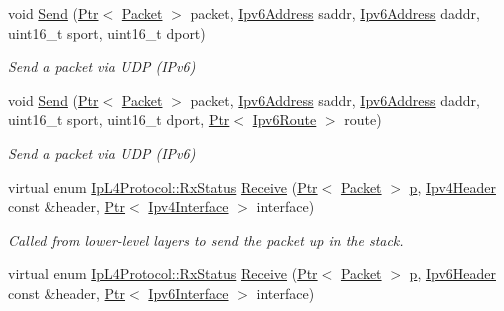 \begin{DoxyCompactItemize}
void \hyperlink{classns3_1_1UdpL4Protocol_a851f80be4bdcda596b2e739610423cc5}{Send} (\hyperlink{classns3_1_1Ptr}{Ptr}$<$ \hyperlink{classns3_1_1Packet}{Packet} $>$ packet, \hyperlink{classns3_1_1Ipv6Address}{Ipv6\+Address} saddr, \hyperlink{classns3_1_1Ipv6Address}{Ipv6\+Address} daddr, uint16\+\_\+t sport, uint16\+\_\+t dport)
\begin{DoxyCompactList}\small\item\em Send a packet via U\+DP (I\+Pv6) \end{DoxyCompactList}\item 
void \hyperlink{classns3_1_1UdpL4Protocol_a67c43cce42ee11ed12829957c758fccb}{Send} (\hyperlink{classns3_1_1Ptr}{Ptr}$<$ \hyperlink{classns3_1_1Packet}{Packet} $>$ packet, \hyperlink{classns3_1_1Ipv6Address}{Ipv6\+Address} saddr, \hyperlink{classns3_1_1Ipv6Address}{Ipv6\+Address} daddr, uint16\+\_\+t sport, uint16\+\_\+t dport, \hyperlink{classns3_1_1Ptr}{Ptr}$<$ \hyperlink{classns3_1_1Ipv6Route}{Ipv6\+Route} $>$ route)
\begin{DoxyCompactList}\small\item\em Send a packet via U\+DP (I\+Pv6) \end{DoxyCompactList}\item 
virtual enum \hyperlink{classns3_1_1IpL4Protocol_afd3744c89902fff232e2fd45f558c80e}{Ip\+L4\+Protocol\+::\+Rx\+Status} \hyperlink{classns3_1_1UdpL4Protocol_a61e0744cc561ec265c8a888552e27310}{Receive} (\hyperlink{classns3_1_1Ptr}{Ptr}$<$ \hyperlink{classns3_1_1Packet}{Packet} $>$ \hyperlink{lte__link__budget__x2__handover__measures_8m_ac9de518908a968428863f829398a4e62}{p}, \hyperlink{classns3_1_1Ipv4Header}{Ipv4\+Header} const \&header, \hyperlink{classns3_1_1Ptr}{Ptr}$<$ \hyperlink{classns3_1_1Ipv4Interface}{Ipv4\+Interface} $>$ interface)
\begin{DoxyCompactList}\small\item\em Called from lower-\/level layers to send the packet up in the stack. \end{DoxyCompactList}\item 
virtual enum \hyperlink{classns3_1_1IpL4Protocol_afd3744c89902fff232e2fd45f558c80e}{Ip\+L4\+Protocol\+::\+Rx\+Status} \hyperlink{classns3_1_1UdpL4Protocol_aeb5af158d9e854d1f528a19214a0e455}{Receive} (\hyperlink{classns3_1_1Ptr}{Ptr}$<$ \hyperlink{classns3_1_1Packet}{Packet} $>$ \hyperlink{lte__link__budget__x2__handover__measures_8m_ac9de518908a968428863f829398a4e62}{p}, \hyperlink{classns3_1_1Ipv6Header}{Ipv6\+Header} const \&header, \hyperlink{classns3_1_1Ptr}{Ptr}$<$ \hyperlink{classns3_1_1Ipv6Interface}{Ipv6\+Interface} $>$ interface)

\end{DoxyCompactItemize}
